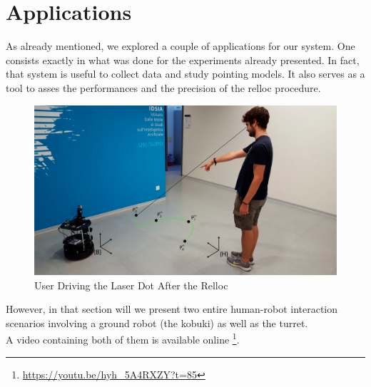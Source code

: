 \section{Applications}
As already mentioned, we explored a couple of applications for our system. One consists exactly in what was done for the experiments already presented. In fact, that system is useful to collect data and study pointing models. It also serves as a tool to asses the performances and the precision of the \ac{relloc} procedure.\\
\begin{figure}
	\centering
	\includegraphics[width=\textwidth]{img/rellocDemo.png}%
	\caption{User Driving the Laser Dot After the Relloc}
	\label{fig:rellocDemoPhoto}
\end{figure}
However, in that section will we present two entire human-robot interaction scenarios involving a ground robot (the kobuki) as well as the turret.\\
A video containing both of them is available online \footnote{\url{https://youtu.be/hyh_5A4RXZY?t=85}}.

